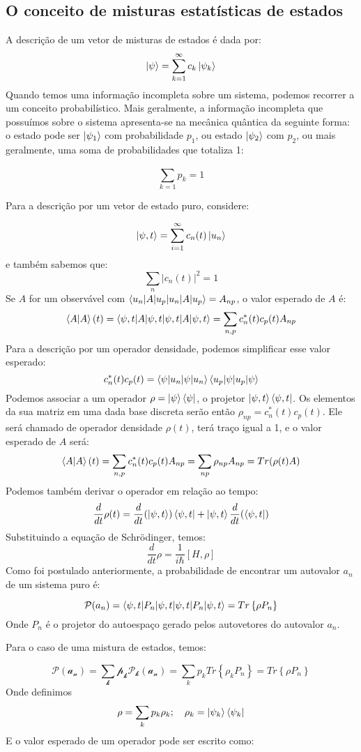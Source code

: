 \documentclass{article}
\begin{document}
	\subsection{O conceito de misturas estatísticas de estados}
	
	A descrição de um vetor de misturas de estados é dada por:
	$$\ket{\psi}=\sum_{k=1}^{\infty} c_{k}\ket{\psi_{k}}   $$
	Quando temos uma informação incompleta sobre um sistema, podemos recorrer a um conceito probabilístico. Mais geralmente, a informação incompleta que possuímos sobre o sistema apresenta-se na mecânica quântica da seguinte forma: o estado pode ser $\ket{\psi_{1}}$ com probabilidade $p_{1}$, ou estado $\ket{\psi_{2}}$ com $p_{2}$, ou mais geralmente, uma soma de probabilidades que totaliza 1:
	
	$$\sum_{k=1}^{} p_{k}=1$$
	
	Para a descrição por um vetor de estado puro, considere:
	
	$$\ket{\psi,t}=\sum_{i=1}^{\infty} c_{n}(t)\ket{u_{n}}   $$
	e também sabemos que:
	$$\sum_{n} |c_{n}(t)|^{2}=1$$
	Se $A$ for um observável com $\braket{ u_{n} |A |u_{p} }=A_{np}$, o valor esperado de $A$ é:
	$$\braket{  A  } (t)=\braket{ \psi,t |A|\psi,t  }=\sum_{n,p}c^{*}_{n}(t)c_{p}(t)A_{np} $$
	Para a descrição por um operador densidade, podemos simplificar esse valor esperado:
	$$c^{*}_{n}(t)c_{p}(t)=\braket{ \psi  |u_{n}  } \braket{ u_{p} |\psi  } $$
	Podemos associar a um operador $\rho  =\ket{\psi} \bra{\psi}$, o projetor $\ket{\psi,t} \bra{\psi,t}$. Os elementos da sua matriz em uma dada base discreta serão então $\rho_{np}=c_{n}^{*}(t)c_{p}(t)$. Ele será chamado de operador densidade $\rho(t)$, terá traço igual a 1, e o valor esperado de $A$ será:
	$$\braket{  A  } (t)=\sum_{n,p}c^{*}_{n}(t)c_{p}(t)A_{np} =\sum_{np} \rho_{np}A_{np}=Tr(\rho(t)A)$$
	Podemos também derivar o operador em relação ao tempo:
	$$\frac{d}{dt}\rho(t)=\frac{d}{dt}(\ket{\psi,t}) \bra{\psi,t} +\ket{\psi,t} \frac{d}{dt}(\bra{\psi,t}) $$
	Substituindo a equação de Schrödinger, temos:
	$$\frac{d}{dt}\rho=\frac{1}{i\hbar}[H,\rho] $$
	Como foi postulado anteriormente, a probabilidade de encontrar um autovalor $a_{n}$ de um sistema puro é:
	
	$$\mathcal{P}(a_{n})=\braket{ \psi,t |P_{n}|\psi,t  } =Tr\left\{ \rho P_{n} \right\} $$
	Onde $P_{n}$ é o projetor do autoespaço gerado pelos autovetores do autovalor $a_{n}$.
	
	Para o caso de uma mistura de estados, temos:
	
	$$\mathcal{P(a_{n})=\sum_{k}p_{k}\mathcal{P_{k}(a_{n})}}=\sum_{k} p_{k}Tr\left\{ \rho_{k}P_{n} \right\}=Tr\left\{ \rho P_{n} \right\}  $$
	Onde definimos
	$$\rho=\sum_{k}p_{k}\rho_{k}; \quad \rho_{k}=\ket{\psi_{k}} \bra{\psi_{k}} $$
	E o valor esperado de um operador pode ser escrito como:
	
\end{document}
